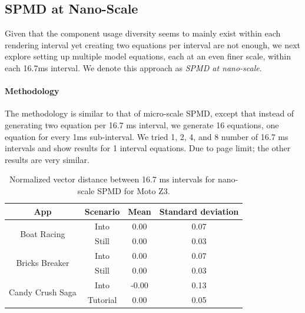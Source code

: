 \subsection{SPMD at Nano-Scale}
\label{sec:modelling_nano}


Given that the component usage diversity 
seems to mainly exist within each rendering interval yet creating two equations per interval
are not enough, we next explore setting up multiple model equations, each at an even finer scale, within each 16.7ms interval. We denote this approach as {\it SPMD at nano-scale}.

\paragraph{Methodology}
The methodology is similar to that of micro-scale SPMD, except
that instead of generating two equation per 16.7 ms interval,
we generate 16 equations, \ie one equation for every 1ms sub-interval. 
We tried 1, 2, 4, and 8 number of 16.7 ms intervals and show results for 1 interval  equations.
Due to page limit; the other results are very similar. 

\begin{table}[tp]
{\footnotesize
    \centering
    \caption{Normalized vector distance between 16.7 ms intervals for nano-scale SPMD for Moto Z3.}
    \vspace{-0.1in}
    \begin{tabular}{|c|c|c|c|}
    \hline
        App & Scenario & Mean & Standard deviation \\
        \hline
         \multirow{2}{20mm}{Boat Racing} & Into & 0.00 & 0.07 \\
         \cline{2-4}
         & Still & 0.00 & 0.03 \\
         \hline
         \multirow{2}{20mm}{Bricks Breaker} & Into & 0.00 & 0.07 \\
         \cline{2-4}
         & Still & 0.00 & 0.03 \\
         \hline
        \multirow{2}{20mm}{Candy Crush Saga} & Into & -0.00 & 0.13 \\
        \cline{2-4}
	     & Tutorial & 0.00 & 0.05 \\
	     \hline
    \end{tabular}
    \label{tab:nano-distance}
    \vspace{-0.1in}
}
\end{table}

